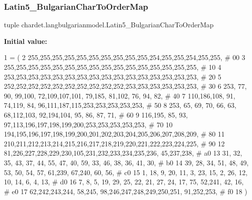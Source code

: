 \mbox{\label{namespacechardet_1_1langbulgarianmodel_a3dbf1687d8644825f08a8e4ffd530e46}} 
\subsubsection{\texorpdfstring{Latin5\+\_\+\+Bulgarian\+Char\+To\+Order\+Map}{Latin5\_BulgarianCharToOrderMap}}
{\footnotesize\ttfamily tuple chardet.\+langbulgarianmodel.\+Latin5\+\_\+\+Bulgarian\+Char\+To\+Order\+Map}

{\bfseries Initial value\+:}
\begin{DoxyCode}
1 =  (
2 255,255,255,255,255,255,255,255,255,255,254,255,255,254,255,255,  \textcolor{comment}{# 00}
3 255,255,255,255,255,255,255,255,255,255,255,255,255,255,255,255,  \textcolor{comment}{# 10}
4 253,253,253,253,253,253,253,253,253,253,253,253,253,253,253,253,  \textcolor{comment}{# 20}
5 252,252,252,252,252,252,252,252,252,252,253,253,253,253,253,253,  \textcolor{comment}{# 30}
6 253, 77, 90, 99,100, 72,109,107,101, 79,185, 81,102, 76, 94, 82,  \textcolor{comment}{# 40}
7 110,186,108, 91, 74,119, 84, 96,111,187,115,253,253,253,253,253,  \textcolor{comment}{# 50}
8 253, 65, 69, 70, 66, 63, 68,112,103, 92,194,104, 95, 86, 87, 71,  \textcolor{comment}{# 60}
9 116,195, 85, 93, 97,113,196,197,198,199,200,253,253,253,253,253,  \textcolor{comment}{# 70}
10 194,195,196,197,198,199,200,201,202,203,204,205,206,207,208,209,  \textcolor{comment}{# 80}
11 210,211,212,213,214,215,216,217,218,219,220,221,222,223,224,225,  \textcolor{comment}{# 90}
12  81,226,227,228,229,230,105,231,232,233,234,235,236, 45,237,238,  \textcolor{comment}{# a0}
13  31, 32, 35, 43, 37, 44, 55, 47, 40, 59, 33, 46, 38, 36, 41, 30,  \textcolor{comment}{# b0}
14  39, 28, 34, 51, 48, 49, 53, 50, 54, 57, 61,239, 67,240, 60, 56,  \textcolor{comment}{# c0}
15   1, 18,  9, 20, 11,  3, 23, 15,  2, 26, 12, 10, 14,  6,  4, 13,  \textcolor{comment}{# d0}
16   7,  8,  5, 19, 29, 25, 22, 21, 27, 24, 17, 75, 52,241, 42, 16,  \textcolor{comment}{# e0}
17  62,242,243,244, 58,245, 98,246,247,248,249,250,251, 91,252,253,  \textcolor{comment}{# f0}
18 )
\end{DoxyCode}


